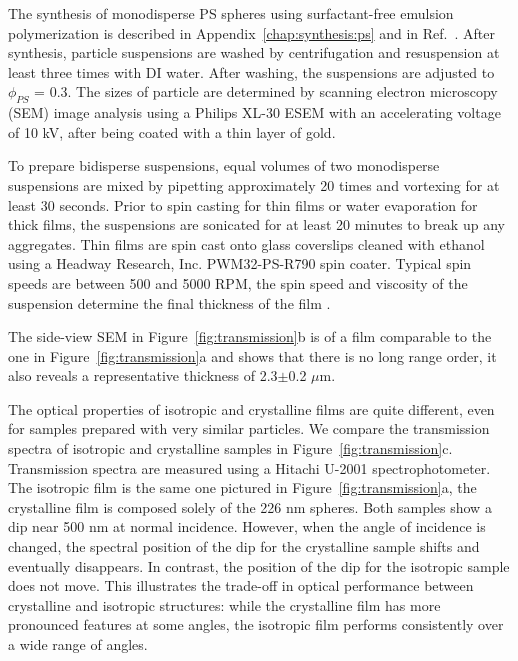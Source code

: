 The synthesis of monodisperse PS spheres using surfactant-free emulsion polymerization is described in Appendix~\ref{chap:synthesis:ps} and in Ref.~\cite{CHONDE:1981p1047}.   
After synthesis, particle suspensions are washed by centrifugation and resuspension at least three times with DI water.  
After washing, the suspensions are adjusted to $\phi_{PS}$ = 0.3.  
The sizes of particle are determined by scanning electron microscopy (SEM) image analysis using a Philips XL-30 ESEM with an accelerating voltage of 10 kV, after being coated with a thin layer of gold.

To prepare bidisperse suspensions, equal volumes of two monodisperse suspensions are mixed by pipetting approximately 20 times and vortexing for at least 30 seconds.  
Prior to spin casting for thin films or water evaporation for thick films, the suspensions are sonicated for at least 20 minutes to break up any aggregates.  
Thin films are spin cast onto glass coverslips cleaned with ethanol using a Headway Research, Inc. PWM32-PS-R790 spin coater.  
Typical spin speeds are between 500 and 5000 RPM, the spin speed and viscosity of the suspension determine the final thickness of the film \cite{Jiang:2004p8684}. 

The side-view SEM in Figure~\ref{fig:transmission}b is of a film comparable to the one in Figure~\ref{fig:transmission}a and shows that there is no long range order, it also reveals a representative thickness of 2.3$\pm$0.2 $\mu$m.  

The optical properties of isotropic and crystalline films are quite different, even for samples prepared with very similar particles.
We compare the transmission spectra of isotropic and crystalline samples in Figure~\ref{fig:transmission}c.
Transmission spectra are measured using a Hitachi U-2001 spectrophotometer.
The isotropic film is the same one pictured in Figure~\ref{fig:transmission}a, the crystalline film is composed solely of the 226 nm spheres.
Both samples show a dip near 500 nm at normal incidence.
However, when the angle of incidence is changed, the spectral position of the dip for the crystalline sample shifts and eventually disappears.  
In contrast,  the position of the dip for the isotropic sample does not move.
This illustrates the trade-off in optical performance between crystalline and isotropic structures: while the crystalline film has more pronounced features at some angles, the isotropic film performs consistently over a wide range of angles.


